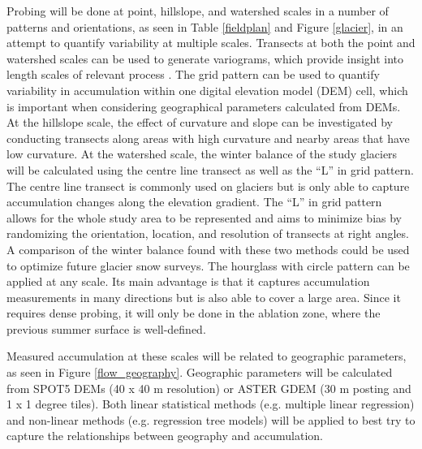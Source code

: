 \documentclass[12pt]{article}
\begin{document}
Probing will be done at point, hillslope, and watershed scales in a number of patterns and orientations, as seen in Table \ref{fieldplan} and Figure \ref{glacier}, in an attempt to quantify variability at multiple scales. Transects at both the point and watershed scales can be used to generate variograms, which provide insight into length scales of relevant process \citep[e.g.][]{Goovaerts2000}. The grid pattern can be used to quantify variability in accumulation within one digital elevation model (DEM) cell, which is important when considering geographical parameters calculated from DEMs. At the hillslope scale, the effect of curvature and slope can be investigated by conducting transects along areas with high curvature and nearby areas that have low curvature. At the watershed scale, the winter balance of the study glaciers will be calculated using the centre line transect as well as the ``L'' in grid pattern. The centre line transect is commonly used on glaciers \citep[e.g.][]{Ostrem1991} but is only able to capture accumulation changes along the elevation gradient. The ``L'' in grid pattern \citep[see][for more details]{Elder2009} allows for the whole study area to be represented and aims to minimize bias by randomizing the orientation, location, and resolution of transects at right angles. A comparison of the winter balance found with these two methods could be used to optimize future glacier snow surveys. The hourglass with circle pattern can be applied at any scale. Its main advantage is that it captures accumulation measurements in many directions but is also able to cover a large area. Since it requires dense probing, it will only be done in the ablation zone, where the previous summer surface is well-defined.

Measured accumulation at these scales will be related to geographic parameters, as seen in Figure \ref{flow_geography}. Geographic parameters will be calculated from SPOT5 DEMs (40 x 40 m resolution) or ASTER GDEM (30 m posting and 1 x 1 degree tiles). Both linear statistical methods (e.g. multiple linear regression) and non-linear methods (e.g. regression tree models) will be applied to best try to capture the relationships between geography and accumulation.
\end{document}
